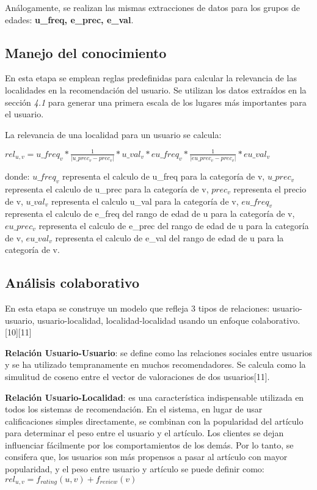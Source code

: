 \documentclass[runningheads]{llncs}
\begin{document}
Análogamente, se realizan las mismas extracciones de datos para los grupos de edades: \textbf{u\_freq, e\_prec, e\_val}.

\subsection{Manejo del conocimiento}
En esta etapa se emplean reglas predefinidas para calcular la relevancia de las localidades en la recomendación del usuario. Se utilizan los datos extraídos en la sección \textit{4.1} para generar una primera escala de los lugares más importantes para el usuario. 

La relevancia de una localidad para un usuario se calcula:

$rel_{u,v} = u\_freq_{v} * \frac{1}{|u\_prec_{v}- prec_v|}  * u\_val_{v} * eu\_freq_{v} *  \frac{1}{|eu\_prec_{v}- prec_v|} * eu\_val_{v}$

donde: $u\_freq_{v}$ representa el calculo de u\_freq para la categoría de v, $u\_prec_{v}$ representa el calculo de u\_prec para la categoría de v, $prec_v$ representa el precio de v, $u\_val_{v}$ representa el calculo u\_val para la categoría de v, $eu\_freq_{v}$ representa el calculo de e\_freq del rango de edad de u para la categoría de v, $eu\_prec_{v}$ representa el calculo de e\_prec del rango de edad de u para la categoría de v, $eu\_val_{v}$ representa el calculo de e\_val del rango de edad de u para la categoría de v.


\subsection{Análisis colaborativo}
En esta etapa se construye un modelo que refleja 3 tipos de relaciones: usuario-usuario, usuario-localidad, localidad-localidad usando un enfoque colaborativo. [10][11]

\textbf{Relación Usuario-Usuario}: se define como las relaciones sociales entre usuarios y se ha utilizado tempranamente en muchos recomendadores. Se calcula como la simulitud de coseno entre el vector de valoraciones de dos usuarios[11].

\textbf{Relación Usuario-Localidad}: es una característica indispensable utilizada en todos los sistemas de recomendación. En el sistema, en lugar de usar calificaciones simples directamente, se combinan con la popularidad del artículo para determinar el peso entre el usuario y el artículo. Los clientes se dejan influenciar fácilmente por los comportamientos de los demás. Por lo tanto, se consifera que, los usuarios son más propensos a pasar al artículo con mayor popularidad, y el peso entre usuario y artículo se puede definir como: \\
$rel_{u,v} = f_{rating}(u,v) + f_{review}(v)$
\end{document}
